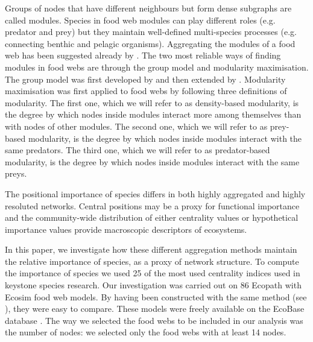 \documentclass[twocolumn]{article}
\begin{document}
	Groups of nodes that have different neighbours but form dense subgraphs are called modules. Species in food web modules can play different roles (e.g. predator and prey) but they maintain well-defined multi-species processes (e.g. connecting benthic and pelagic organisms). Aggregating the modules of a food web has been suggested already by \citet{Allesina2009a}. The two most reliable ways of finding modules in food webs are through the group model and modularity maximisation. The group model was first developed by \citet{Allesina2009a} and then extended by \citet{Sander2015}.	Modularity maximisation was first applied to food webs by \citet{Guimera2010} following three definitions of modularity.	The first one, which we will refer to as density-based modularity, is the degree by which nodes inside modules interact more among themselves than with nodes of other modules.	The second one, which we will refer to as prey-based modularity, is the degree by which nodes inside modules interact with the same predators.	The third one, which we will refer to as predator-based modularity, is the degree by which nodes inside modules interact with the same preys.

	The positional importance of species differs in both highly aggregated and highly resoluted networks. Central positions may be a proxy for functional importance and the community-wide distribution of either centrality values \citep{Bauer2010} or hypothetical importance values \citep{Mills1993} provide macroscopic descriptors of ecosystems.

	In this paper, we investigate how these different aggregation methods maintain the relative importance of species, as a proxy of network structure.
	To compute the importance of species we used 25 of the most used centrality indices used in keystone species research.
	Our investigation was carried out on 86 Ecopath with Ecosim food web models. By having been constructed with the same method (see \citet{Okey2004}), they were easy to compare. These models were freely available on the EcoBase database \citep{Colleter2013}. The way we selected the food webs to be included in our analysis was the number of nodes: we selected only the food webs with at least 14 nodes. %

\end{document}
